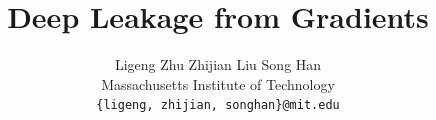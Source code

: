 \documentclass{article}
\title{Deep Leakage from Gradients}
\author{
Ligeng Zhu \quad Zhijian Liu \quad Song Han\\
Massachusetts Institute of Technology \\
{\tt\small\{ligeng, zhijian, songhan\}@mit.edu}
}
\begin{document}
\maketitle









{\small


}
\end{document}
